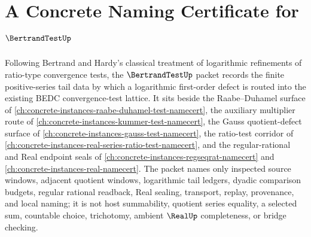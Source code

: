 \chapter{A Concrete Naming Certificate for $\BertrandTestUp$}
\label{ch:concrete-instances-bertrand-test-namecert}

Following Bertrand and Hardy's classical treatment of logarithmic refinements of ratio-type convergence tests, the $\BertrandTestUp$ packet records the finite positive-series tail data by which a logarithmic first-order defect is routed into the existing BEDC convergence-test lattice. It sits beside the Raabe--Duhamel surface of \autoref{ch:concrete-instances-raabe-duhamel-test-namecert}, the auxiliary multiplier route of \autoref{ch:concrete-instances-kummer-test-namecert}, the Gauss quotient-defect surface of \autoref{ch:concrete-instances-gauss-test-namecert}, the ratio-test corridor of \autoref{ch:concrete-instances-real-series-ratio-test-namecert}, and the regular-rational and Real endpoint seals of \autoref{ch:concrete-instances-regseqrat-namecert} and \autoref{ch:concrete-instances-real-namecert}. The packet names only inspected source windows, adjacent quotient windows, logarithmic tail ledgers, dyadic comparison budgets, regular rational readback, Real sealing, transport, replay, provenance, and local naming; it is not host summability, quotient series equality, a selected sum, countable choice, trichotomy, ambient $\RealUp$ completeness, or bridge checking.

